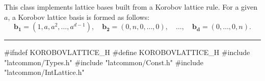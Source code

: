% 
% 
% 
% 


This class implements lattice bases built from a Korobov lattice rule. 
For a given $a$, a Korobov lattice basis is formed as follows:
\[
\mathbf{b_1} = (1, a, a^2, \ldots, a^{d-1}),\quad
 \mathbf{b_2} = (0, n, 0, \ldots, 0),\quad  \ldots,\quad
  \mathbf{b_d} = (0, \ldots, 0, n).
\]


\bigskip\hrule
\code\hide
#ifndef KOROBOVLATTICE_H
#define KOROBOVLATTICE_H
\endhide
#include "latcommon/Types.h"
#include "latcommon/Const.h"
#include "latcommon/IntLattice.h"


